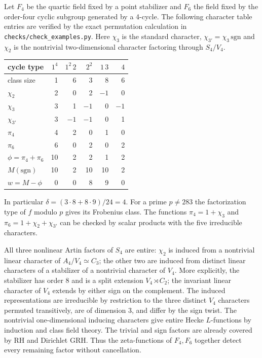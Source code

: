 \documentclass[11pt]{article}
\theoremstyle{definition}\newtheorem{definition}[theorem]{Definition}
\begin{document}
Let $F_4$ be the quartic field fixed by a point stabilizer and $F_6$ the field fixed by the order-four cyclic subgroup generated by a 4-cycle. The following character table entries are verified by the exact permutation calculation in \texttt{checks/check\_examples.py}. Here $\chi_3$ is the standard character, $\chi_{3'}=\chi_3\,\mathrm{sgn}$ and $\chi_2$ is the nontrivial two-dimensional character factoring through $S_4/V_4$.
\begin{center}\small
\begin{tabular}{lrrrrr}
\toprule
cycle type & $1^4$ & $1^2\,2$ & $2^2$ & $1\,3$ & $4$\\\midrule
class size & 1&6&3&8&6\\
$\chi_2$ & 2&0&2&$-1$&0\\
$\chi_3$ & 3&1&$-1$&0&$-1$\\
$\chi_{3'}$ & 3&$-1$&$-1$&0&1\\
$\pi_4$ &4&2&0&1&0\\
$\pi_6$ &6&0&2&0&2\\
$\phi=\pi_4+\pi_6$ &10&2&2&1&2\\
$M(\mathrm{sgn})$ &10&2&10&10&2\\
$w=M-\phi$ &0&0&8&9&0\\\bottomrule
\end{tabular}\end{center}
In particular $\delta=(3\cdot8+8\cdot9)/24=4$. For a prime $p\ne283$ the factorization type of $f$ modulo $p$ gives its Frobenius class. The functions $\pi_4=1+\chi_3$ and $\pi_6=1+\chi_2+\chi_{3'}$ can be checked by scalar products with the five irreducible characters.

All three nonlinear Artin factors of $S_4$ are entire: $\chi_2$ is induced from a nontrivial linear character of $A_4/V_4\simeq C_3$; the other two are induced from distinct linear characters of a stabilizer of a nontrivial character of $V_4$. More explicitly, the stabilizer has order 8 and is a split extension $V_4\rtimes C_2$; the invariant linear character of $V_4$ extends by either sign on the complement. The induced representations are irreducible by restriction to the three distinct $V_4$ characters permuted transitively, are of dimension 3, and differ by the sign twist. The nontrivial one-dimensional inducing characters give entire Hecke $L$-functions by induction and class field theory. The trivial and sign factors are already covered by RH and Dirichlet GRH. Thus the zeta-functions of $F_4,F_6$ together detect every remaining factor without cancellation.
\end{document}
